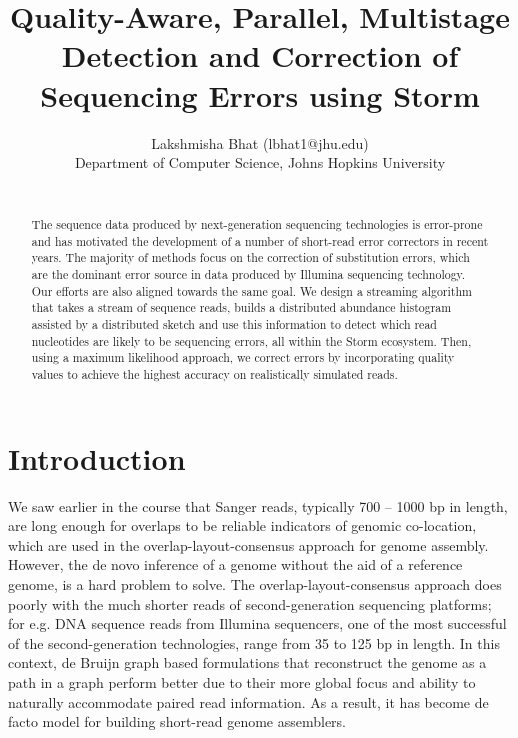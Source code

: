\documentclass[11pt]{article}
\begin{document}
\pagestyle{plain} 
\title{Quality-Aware, Parallel, Multistage Detection and Correction of Sequencing Errors using Storm}
\large
\date{}
\author{Lakshmisha Bhat (lbhat1@jhu.edu) \\Department of Computer Science, Johns Hopkins University \\[2\baselineskip]\\ }
\maketitle
\vspace{-.5in}
\cfoot{\thepage}
\rfoot{}
\rhead{}


\begin{abstract}
The sequence data produced by next-generation sequencing technologies is error-prone and has motivated the development of a number of short-read error correctors in recent years. The majority of methods focus on the correction of substitution errors, which are the dominant error source in data produced by Illumina sequencing technology. Our efforts are also aligned towards the same goal. We design a streaming algorithm that takes a stream of sequence reads, builds a distributed abundance histogram assisted by a distributed sketch and use this information to detect which read nucleotides are likely to be sequencing errors, all within the Storm ecosystem. Then, using a maximum likelihood approach, we correct errors by incorporating quality values to achieve the highest accuracy on realistically simulated reads.\\
\end{abstract}

\section{Introduction}
We saw earlier in the course that Sanger reads, typically 700 -- 1000 bp in length, are long enough for overlaps to be reliable indicators of genomic co-location, which are used in the overlap-layout-consensus approach for genome assembly. However, the de novo inference of a genome without the aid of a reference genome, is a hard problem to solve. The overlap-layout-consensus approach does poorly with the much shorter reads of second-generation sequencing platforms; for e.g. DNA sequence reads from Illumina sequencers, one of the most successful of the second-generation technologies, range from 35 to 125 bp in length. In this context, de Bruijn graph \cite{debruijn} based formulations that reconstruct the genome as a path in a graph perform better due to their more global focus and ability to naturally accommodate paired read information. As a result, it has become de facto model for building short-read genome assemblers. \\
\end{document}
